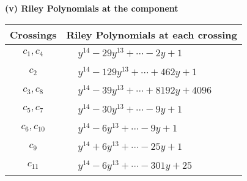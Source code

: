 \documentclass[1p]{elsarticle_modified}
\theoremstyle{definition}
\begin{document}
\newpage\renewcommand{\arraystretch}{1}
\flushleft \textbf{(v) Riley Polynomials at the component}\newline \\
\begin{tabular}{m{50pt}|m{274pt}}
Crossings & \hspace{64pt}Riley Polynomials at each crossing \\
\hline $$\begin{aligned}c_{1},c_{4}\end{aligned}$$&$\begin{aligned}
&y^{14}-29 y^{13}+\cdots-2 y+1
\end{aligned}$\\
\hline $$\begin{aligned}c_{2}\end{aligned}$$&$\begin{aligned}
&y^{14}-129 y^{13}+\cdots+462 y+1
\end{aligned}$\\
\hline $$\begin{aligned}c_{3},c_{8}\end{aligned}$$&$\begin{aligned}
&y^{14}-39 y^{13}+\cdots+8192 y+4096
\end{aligned}$\\
\hline $$\begin{aligned}c_{5},c_{7}\end{aligned}$$&$\begin{aligned}
&y^{14}-30 y^{13}+\cdots-9 y+1
\end{aligned}$\\
\hline $$\begin{aligned}c_{6},c_{10}\end{aligned}$$&$\begin{aligned}
&y^{14}-6 y^{13}+\cdots-9 y+1
\end{aligned}$\\
\hline $$\begin{aligned}c_{9}\end{aligned}$$&$\begin{aligned}
&y^{14}+6 y^{13}+\cdots-25 y+1
\end{aligned}$\\
\hline $$\begin{aligned}c_{11}\end{aligned}$$&$\begin{aligned}
&y^{14}-6 y^{13}+\cdots-301 y+25
\end{aligned}$\\
\hline
\end{tabular}\\~\\
\end{document}

